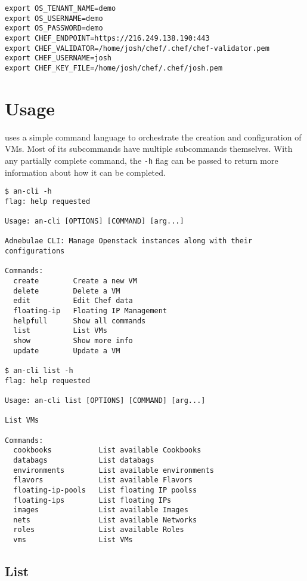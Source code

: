 \documentclass[11pt]{article}
\begin{document}
\begin{lstlisting}
export OS_TENANT_NAME=demo
export OS_USERNAME=demo
export OS_PASSWORD=demo
export CHEF_ENDPOINT=https://216.249.138.190:443
export CHEF_VALIDATOR=/home/josh/chef/.chef/chef-validator.pem
export CHEF_USERNAME=josh
export CHEF_KEY_FILE=/home/josh/chef/.chef/josh.pem
\end{lstlisting}

\pagebreak

\section{Usage}

\aN uses a simple command language to orchestrate the creation and
configuration of VMs. Most of its subcommands have multiple subcommands
themselves. With any partially complete command, the \texttt{-h} flag
can be passed to return more information about how it can be completed.

\begin{lstlisting}
$ an-cli -h
flag: help requested

Usage: an-cli [OPTIONS] [COMMAND] [arg...]

Adnebulae CLI: Manage Openstack instances along with their configurations

Commands:
  create        Create a new VM
  delete        Delete a VM
  edit          Edit Chef data
  floating-ip   Floating IP Management
  helpfull      Show all commands
  list          List VMs
  show          Show more info
  update        Update a VM

$ an-cli list -h
flag: help requested

Usage: an-cli list [OPTIONS] [COMMAND] [arg...]

List VMs

Commands:
  cookbooks           List available Cookbooks
  databags            List databags
  environments        List available environments
  flavors             List available Flavors
  floating-ip-pools   List floating IP poolss
  floating-ips        List floating IPs
  images              List available Images
  nets                List available Networks
  roles               List available Roles
  vms                 List VMs

\end{lstlisting}

\subsection{List}
\end{document}
